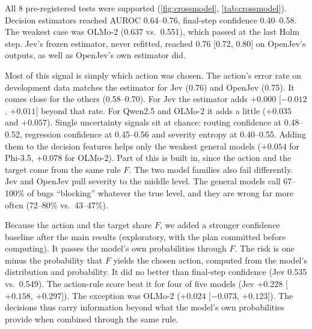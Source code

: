\begin{widetable}
\centering
\caption{Per-model results on the 500 held-out bugs. AUROC columns rank wrong workflow actions (95\% bootstrap CI). They show
the decision estimator fitted on each model's own development outputs,
final-step confidence and the action-rule score. The last column applies
Jev's frozen estimator unchanged. Cost
columns are from the pre-registered review test (\cref{sec:intervention}). The oracle is an upper bound that must spend
all 50 reviews.}
\label{tab:crossmodel}
\resizebox{\textwidth}{!}{}
\end{widetable}

All 8 pre-registered tests were supported (\cref{fig:crossmodel},
\cref{tab:crossmodel}).
Decision estimators reached AUROC 0.64--0.76, final-step confidence
0.40--0.58. The weakest case was OLMo-2 (0.637 vs.\ 0.551), which passed
at the last Holm step. Jev's frozen estimator, never refitted, reached
0.76 [0.72, 0.80] on OpenJev's outputs, as well as OpenJev's own
estimator did.

Most of this signal is simply which action was chosen. The action's
error rate on development data matches the estimator for Jev (0.76) and OpenJev (0.75). It comes close for the others (0.58--0.70). For Jev the
estimator adds $+0.000$ [$-0.012$, $+0.011$] beyond that rate. For Qwen2.5 and OLMo-2 it adds a little
($+0.035$ and $+0.057$). Single uncertainty signals sit at chance:
routing confidence at 0.48--0.52, regression confidence at 0.45--0.56
and severity entropy at 0.40--0.55. Adding them to the decision features
helps only the weakest general models ($+0.054$ for Phi-3.5, $+0.078$ for
OLMo-2). Part of this is built in, since the
action and the target come from the same rule $F$. The two model
families also fail differently. Jev and OpenJev pull severity to the middle level. The general models
call 67--100\% of bugs ``blocking'' whatever the true level, and they are
wrong far more often
(72--80\% vs.\ 43--47\%).

Because the action and the target share $F$, we added a stronger
confidence baseline after the main results (exploratory, with the plan
committed before computing). It passes the model's own probabilities through $F$. The risk is one
minus the probability that $F$ yields the chosen action, computed from
the model's \score{} distribution and \noul{} probability. It did no better than final-step confidence (Jev 0.535 vs.\ 0.549). The action-rule score beat it for four of five
models
(Jev $+0.228$ [$+0.158$, $+0.297$]). The exception was OLMo-2 ($+0.024$
[$-0.073$, $+0.123$]). The decisions thus carry information beyond what the model's own
probabilities provide when combined through the same rule.


